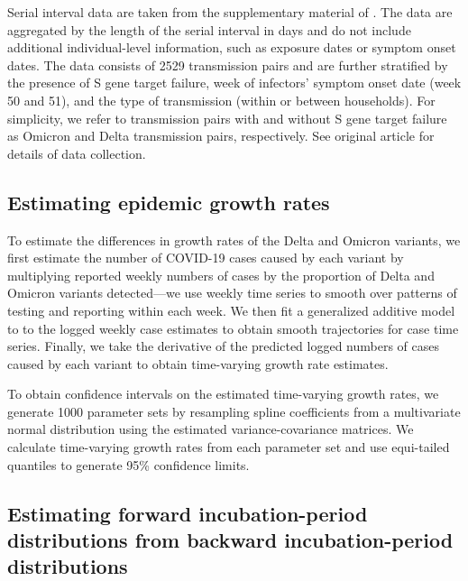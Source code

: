 \documentclass[12pt]{article}
\begin{document}
Serial interval data are taken from the supplementary material of \cite{backer2021omicron}.
The data are aggregated by the length of the serial interval in days and do not include additional individual-level information, such as exposure dates or symptom onset dates.
The data consists of 2529 transmission pairs and are further stratified by the presence of S gene target failure, week of infectors' symptom onset date (week 50 and 51), and the type of transmission (within or between households).
For simplicity, we refer to transmission pairs with and without S gene target failure as Omicron and Delta transmission pairs, respectively.
See original article for details of data collection.

\subsection{Estimating epidemic growth rates}

To estimate the differences in growth rates of the Delta and Omicron variants, we first estimate the number of COVID-19 cases caused by each variant by multiplying reported weekly numbers of cases by the proportion of Delta and Omicron variants detected---we use weekly time series to smooth over patterns of testing and reporting within each week. 
We then fit a generalized additive model \citep{wood2001mgcv} to to the logged weekly case estimates to obtain smooth trajectories for case time series.
Finally, we take the derivative of the predicted logged numbers of cases caused by each variant to obtain time-varying growth rate estimates.

To obtain confidence intervals on the estimated time-varying growth rates, we generate 1000 parameter sets by resampling spline coefficients from a multivariate normal distribution using the estimated variance-covariance matrices.
We calculate time-varying growth rates from each parameter set and use equi-tailed quantiles to generate 95\% confidence limits. 

\subsection{Estimating forward incubation-period distributions from backward incubation-period distributions}
\end{document}
